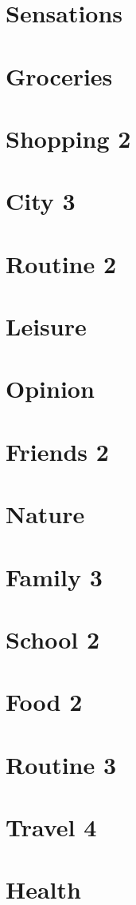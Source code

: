 \documentclass[a4paper,11pt,oneside]{book}
\begin{document}
\section{Sensations}
\section{Groceries}
\section{Shopping 2}
\section{City 3}
\section{Routine 2}
\section{Leisure}
\section{Opinion}
\section{Friends 2}
\section{Nature}
\section{Family 3}
\section{School 2}
\section{Food 2}
\section{Routine 3}
\section{Travel 4}
\section{Health}
\end{document}
